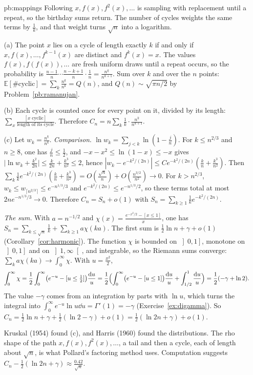 \begin{solution}{pb:mappings}
\idea Following $x,f(x),f^2(x),\dots$ is sampling with replacement until a repeat, so the birthday sums return. The number of cycles weights the same terms
by $\frac1k$, and that weight turns $\sqrt n$ into a logarithm.

\writeup (a) The point $x$ lies on a cycle of length exactly $k$ if and only if $x,f(x),\dots,f^{k-1}(x)$ are distinct and $f^k(x)=x$. The values $f(x),f(f(x)),\dots$ are fresh uniform draws until
a repeat occurs, so the probability is $\frac{n-1}n\cdots\frac{n-k+1}n\cdot\frac1n=\frac{n^{\underline k}}{n^{k+1}}$. Sum over $k$ and over the $n$ points: $\mathbb E[\#\text{cyclic}]=\sum_k\frac{n^{\underline k}}{n^k}=Q(n)$,
and $Q(n)\sim\sqrt{\pi n/2}$ by Problem~\ref{pb:ramanujan}.

(b) Each cycle is counted once for every point on it, divided by its length: $\sum_x\frac{[x\text{ cyclic}]}{\text{length of its cycle}}$. Therefore $C_n=n\sum_k\frac1k\cdot\frac{n^{\underline k}}{n^{k+1}}$.

(c) Let $w_k=\frac{n^{\underline k}}{n^k}$. \emph{Comparison.} $\ln w_k=\sum_{j<k}\ln(1-\frac jn)$. For $k\le n^{2/3}$ and $n\ge8$, one has $\frac jn\le\frac12$, and $-x-x^2\le\ln(1-x)\le-x$ gives
$\bigl|\ln w_k+\frac{k^2}{2n}\bigr|\le\frac k{2n}+\frac{k^3}{n^2}\le2$, hence $|w_k-e^{-k^2/(2n)}|\le Ce^{-k^2/(2n)}(\frac kn+\frac{k^3}{n^2})$. Then
$\sum_k\frac1ke^{-k^2/(2n)}(\frac kn+\frac{k^3}{n^2})=O(\frac{\sqrt n}n)+O(\frac{n^{3/2}}{n^2})\to0$. For $k>n^{2/3}$, $w_k\le w_{\lceil n^{2/3}\rceil}\le e^{-n^{1/3}/3}$ and $e^{-k^2/(2n)}\le e^{-n^{1/3}/2}$, so these terms total
at most $2ne^{-n^{1/3}/3}\to0$. Therefore $C_n=S_n+o(1)$ with $S_n=\sum_{k\ge1}\frac1ke^{-k^2/(2n)}$.

\emph{The sum.} With $a=n^{-1/2}$ and $\chi(x)=\frac{e^{-x^2/2}-[x\le1]}x$, one has $S_n=\sum_{k\le\sqrt n}\frac1k+\sum_{k\ge1}a\chi(ka)$. The first sum is $\frac12\ln n+\gamma+o(1)$ (Corollary~\ref{cor:harmonic}). The function
$\chi$ is bounded on $\left]0,1\right]$, monotone on $\left]0,1\right]$ and on $\left]1,\infty\right[$, and integrable, so the Riemann sums converge: $\sum_ka\chi(ka)\to\int_0^\infty\chi$. With $u=\frac{x^2}2$,
\[
\int_0^\infty\chi=\frac12\int_0^\infty\bigl(e^{-u}-[u\le\tfrac12]\bigr)\frac{\mathrm du}u=\frac12\Bigl(\int_0^\infty\bigl(e^{-u}-[u\le1]\bigr)\frac{\mathrm du}u+\int_{1/2}^1\frac{\mathrm du}u\Bigr)=\frac12(-\gamma+\ln2).
\]
The value $-\gamma$ comes from an integration by parts with $\ln u$, which turns the integral into $\int_0^\infty e^{-u}\ln u\dd u=\Gamma'(1)=-\gamma$ (Exercise~\ref{ex:digamma}). So
$C_n=\frac12\ln n+\gamma+\frac12(\ln2-\gamma)+o(1)=\frac12(\ln2n+\gamma)+o(1)$.

\leads Kruskal (1954) found (c), and Harris (1960) found the distributions. The rho shape of the path $x,f(x),f^2(x),\dots$, a tail and then a cycle, each of length about
$\sqrt n$, is what Pollard's factoring method uses. Computation suggests $C_n-\frac12(\ln2n+\gamma)\approx\frac{0.42}{\sqrt n}$.
\end{solution}

